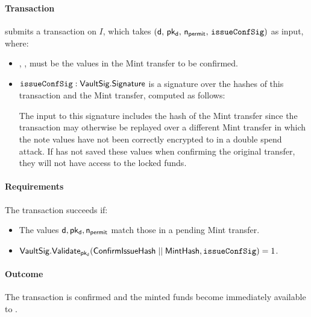 \paragraph{Transaction}
\vault submits a \confirmIssue transaction on $I$, which takes $(\mathsf{d},\, \mathsf{pk_d},\, \mathsf{n_{permit}},\, \mathtt{issueConfSig})$ as input, where:
\begin{itemize}
    \item \dvf, \pkd, \nlock must be the values in the Mint transfer to be confirmed.
    
    \item $\mathtt{issueConfSig} : \mathsf{VaultSig}.\mathsf{Signature}$ is a signature over the hashes of this transaction and the Mint transfer, computed as follows:
    
    The input to this signature includes the hash of the Mint transfer since the \confirmIssue transaction may otherwise be replayed over a different Mint transfer in which the note values have not been correctly encrypted to \vault in a double spend attack.
    If \vault has not saved these values when confirming the original transfer, they will not have access to the locked funds.
\end{itemize}

\paragraph{Requirements}
The \confirmIssue transaction succeeds if:
\begin{itemize}
    \item The values $\mathsf{d}, \mathsf{pk_d}, \mathsf{n_{permit}}$ match those in a pending Mint transfer.
    \item  $\mathsf{VaultSig}.\mathsf{Validate}_{\mathsf{pk_d}}(\mathsf{ConfirmIssueHash} \;||\; \mathsf{MintHash}, \mathtt{issueConfSig}) = 1$.
\end{itemize}

\paragraph{Outcome}
The \mint transaction is confirmed and the minted funds become immediately available to \issuer.

